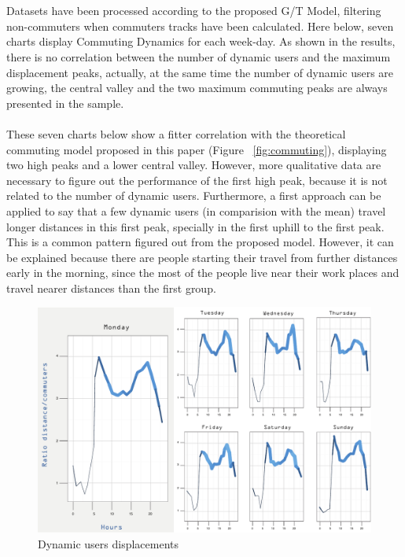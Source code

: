 \\
\\
Datasets have been processed according to the proposed G/T Model, filtering non-commuters when commuters tracks have been calculated. Here below, seven charts display Commuting Dynamics for each week-day.
As shown in the results, there is no correlation between the number of dynamic users and the maximum displacement peaks, actually, at the same time the number of dynamic users are growing, the central valley and the two maximum commuting peaks are always presented in the sample.
\\
\\
These seven charts below show a fitter correlation with the theoretical commuting model proposed in this paper (Figure ~\ref{fig:commuting}), displaying two high peaks and a lower central valley. However, more qualitative data are necessary to figure out the performance of the first high peak, because it is not related to the number of dynamic users. Furthermore, a first approach can be applied to say that a few dynamic users (in comparision with the mean) travel longer distances in this first peak, specially in  the first uphill to the first peak. This is a common pattern figured out from the proposed model. However, it can be explained because there are people starting their travel from further distances early in the morning, since the most of the people live near their work places and travel nearer distances than the first group.  


\begin{figure}[h]
\begin{center}
\includegraphics[scale = 0.75] {results/images/commuting_results.pdf}
\caption{Dynamic users displacements}
\label{fig:dynamic_displacements}
\end{center}
\end{figure}

